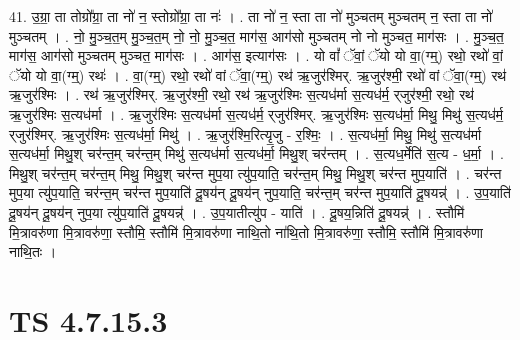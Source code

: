 \documentclass[17pt]{extarticle}
\begin{document}
41. उ॒ग्रा॒ ता तोग्रो᳚ग्रा॒ ता नो॑ न॒ स्तोग्रो᳚ग्रा॒ ता नः॑ । . ता नो॑ न॒ स्ता ता नो॑ मुञ्चतम् मुञ्चतम् न॒ स्ता ता नो॑ मुञ्चतम् । . नो॒ मु॒ञ्च॒त॒म् मु॒ञ्च॒त॒म् नो॒ नो॒ मु॒ञ्च॒त॒ माग॑स॒ आग॑सो मुञ्चतम् नो नो मुञ्चत॒ माग॑सः । . मु॒ञ्च॒त॒ माग॑स॒ आग॑सो मुञ्चतम् मुञ्चत॒ माग॑सः । . आग॑स॒ इत्याग॑सः । . यो वां᳚ ॅवां॒ ॅयो यो वा॒(ग्म्॒) रथो॒ रथो॑ वां॒ ॅयो यो वा॒(ग्म्॒) रथः॑ । . वा॒(ग्म्॒) रथो॒ रथो॑ वां ॅवा॒(ग्म्॒) रथ॑ ऋ॒जुर॑श्मिर्. ऋ॒जुर॑श्मी॒ रथो॑ वां ॅवा॒(ग्म्॒) रथ॑ ऋ॒जुर॑श्मिः । . रथ॑ ऋ॒जुर॑श्मिर्. ऋ॒जुर॑श्मी॒ रथो॒ रथ॑ ऋ॒जुर॑श्मिः स॒त्यध॑र्मा स॒त्यध॑र्म॒ र्‌जुर॑श्मी॒ रथो॒ रथ॑ ऋ॒जुर॑श्मिः स॒त्यध॑र्मा । . ऋ॒जुर॑श्मिः स॒त्यध॑र्मा स॒त्यध॑र्म॒ र्‌जुर॑श्मिर्. ऋ॒जुर॑श्मिः स॒त्यध॑र्मा॒ मिथु॒ मिथु॑ स॒त्यध॑र्म॒ र्‌जुर॑श्मिर्. ऋ॒जुर॑श्मिः स॒त्यध॑र्मा॒ मिथु॑ । . ऋ॒जुर॑श्मि॒रित्यृ॒जु - र॒श्मिः॒ । . स॒त्यध॑र्मा॒ मिथु॒ मिथु॑ स॒त्यध॑र्मा स॒त्यध॑र्मा॒ मिथु॒श् चर॑न्त॒म् चर॑न्त॒म् मिथु॑ स॒त्यध॑र्मा स॒त्यध॑र्मा॒ मिथु॒श् चर॑न्तम् । . स॒त्यध॒र्मेति॑ स॒त्य - ध॒र्मा॒ । . मिथु॒श् चर॑न्त॒म् चर॑न्त॒म् मिथु॒ मिथु॒श् चर॑न्त मुप॒या त्यु॑प॒याति॒ चर॑न्त॒म् मिथु॒ मिथु॒श् चर॑न्त मुप॒याति॑ । . चर॑न्त मुप॒या त्यु॑प॒याति॒ चर॑न्त॒म् चर॑न्त मुप॒याति॑ दू॒षय॑न् दू॒षय॑न् नुप॒याति॒ चर॑न्त॒म् चर॑न्त मुप॒याति॑ दू॒षयन्न्॑ । . उ॒प॒याति॑ दू॒षय॑न् दू॒षय॑न् नुप॒या त्यु॑प॒याति॑ दू॒षयन्न्॑ । . उ॒प॒यातीत्यु॑प - याति॑ । . दू॒षय॒न्निति॑ दू॒षयन्न्॑ । . स्तौमि॑ मि॒त्रावरु॑णा मि॒त्रावरु॑णा॒ स्तौमि॒ स्तौमि॑ मि॒त्रावरु॑णा नाथि॒तो ना॑थि॒तो मि॒त्रावरु॑णा॒ स्तौमि॒ स्तौमि॑ मि॒त्रावरु॑णा नाथि॒तः । \newline
\pagebreak
{}

\section{ TS 4.7.15.3 }
\end{document}

